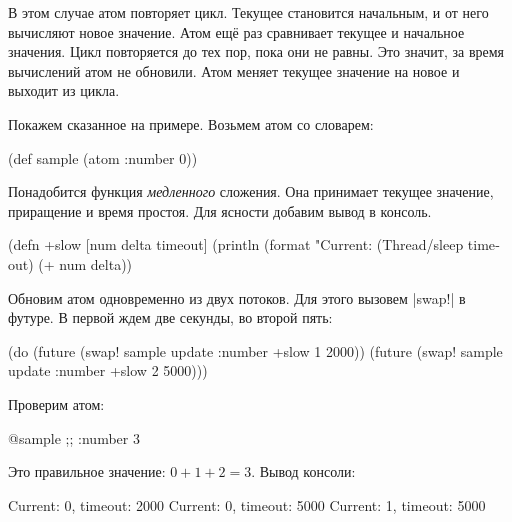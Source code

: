 В этом случае атом повторяет цикл. Текущее становится начальным, и от него
вычисляют новое значение. Атом ещ\"{е} раз сравнивает текущее и начальное
значения. Цикл повторяется до тех пор, пока они не равны. Это значит, за время
вычислений атом не обновили. Атом меняет текущее значение на новое и выходит из
цикла.

Покажем сказанное на примере. Возьмем атом со словарем:

\begin{english}
  \begin{clojure}
(def sample (atom {:number 0}))
  \end{clojure}
\end{english}

Понадобится функция \emph{медленного} сложения. Она принимает текущее значение,
приращение и время простоя. Для ясности добавим вывод в консоль.

\begin{english}
  \begin{clojure}
(defn +slow
  [num delta timeout]
  (println (format "Current: %
  (Thread/sleep timeout)
  (+ num delta))
  \end{clojure}
\end{english}


Обновим атом одновременно из двух потоков. Для этого вызовем \spverb|swap!| в
футуре. В первой ждем две секунды, во второй пять:

\begin{english}
  \begin{clojure}
(do (future (swap! sample update :number +slow 1 2000))
    (future (swap! sample update :number +slow 2 5000)))
  \end{clojure}
\end{english}

\noindent
Проверим атом:

\begin{english}
  \begin{clojure}
@sample ;; {:number 3}
  \end{clojure}
\end{english}

\noindent
Это правильное значение: $0 + 1 + 2 = 3$. Вывод консоли:

\begin{english}
  \begin{text}
Current: 0, timeout: 2000
Current: 0, timeout: 5000
Current: 1, timeout: 5000
  \end{text}
\end{english}

